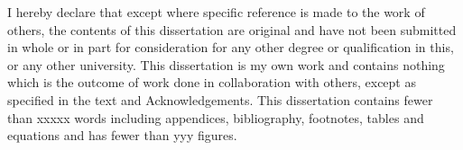 
\begin{declaration}

I hereby declare that except where specific reference is made to the work of 
others, the contents of this dissertation are original and have not been 
submitted in whole or in part for consideration for any other degree or 
qualification in this, or any other university. This dissertation is my own 
work and contains nothing which is the outcome of work done in collaboration 
with others, except as specified in the text and Acknowledgements. This 
dissertation contains fewer than xxxxx words including appendices, 
bibliography, footnotes, tables and equations and has fewer than yyy figures.


\end{declaration}

